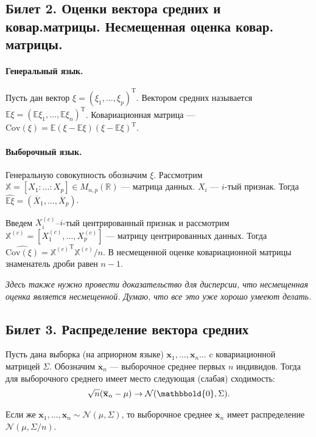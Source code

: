 \subsection{Билет 2. Оценки вектора средних и ковар.матрицы. Несмещенная оценка ковар. матрицы.}
\paragraph{Генеральный язык.}

Пусть дан вектор $\xi = (\xi_1, \ldots, \xi_p)^\mathrm T$. Вектором средних называется $\mathbb E\xi = (\mathbb E\xi_1, \ldots, \mathbb E\xi_n)^\mathrm T$.
Ковариационная матрица --- $\mathrm{Cov}(\xi) = \mathbb E(\xi-\mathbb E\xi)(\xi-\mathbb E\xi)^\mathrm T$.
\paragraph{Выборочный язык.}

Генеральную совокупность обозначим $\xi$.
Рассмотрим $\mathbb X = [X_1\colon\ldots\colon X_p] \in M_{n, p} (\mathbb R)$ --- матрица данных. $X_i$ --- $i$-тый признак. 
Тогда $\widehat{\mathbb E \xi} = \left(\overline X_1, \ldots, \overline X_p\right)$.

Введем $X_i^{(c)}$--$i$-тый центрированный признак и рассмотрим $\mathbb X^{(c)} = [X_1^{(c)}, \ldots, X_p^{(c)}]$ --- матрицу центрированных данных.
Тогда $\widehat{\mathrm {Cov}(\xi)} = {\mathbb X^{(c)}}^\mathrm T \mathbb X^{(c)} / n$. В несмещенной оценке ковариационной матрицы знаменатель дроби равен $n-1$.

\textit{Здесь также нужно провести доказательство для дисперсии, что несмещенная оценка является несмещенной. Думаю, что все это уже хорошо умееют делать.}

\subsection{Билет 3. Распределение вектора средних}
\begin{thm}
    Пусть дана выборка (на априорном языке) $\mathbf x_1, \ldots, \mathbf x_n \ldots$ c ковариационной матрицей $\Sigma$.
    Обозначим $\overline{\mathbf x}_n$ --- выборочное среднее первых $n$ индивидов.
    Тогда для выборочного среднего имеет место следующая (слабая) сходимость:
    \begin{gather*}
        \sqrt{n} (\overline{\mathbf x}_n - \mu) \to \mathcal N(\mathbbold{0}, \Sigma).
    \end{gather*}

    Если же $\mathbf x_1, \ldots, \mathbf x_n \sim \mathcal N(\mu, \Sigma)$, то выборочное среднее $\overline{\mathbf x}_n$ имеет распределение $\mathcal N(\mu, \Sigma/n)$.
\end{thm}

